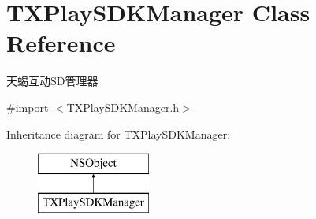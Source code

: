 \hypertarget{interface_t_x_play_s_d_k_manager}{}\section{T\+X\+Play\+S\+D\+K\+Manager Class Reference}
\label{interface_t_x_play_s_d_k_manager}


天蝎互动\+S\+D管理器  




{\ttfamily \#import $<$T\+X\+Play\+S\+D\+K\+Manager.\+h$>$}

Inheritance diagram for T\+X\+Play\+S\+D\+K\+Manager\+:\begin{figure}[H]
\begin{center}
\leavevmode
\includegraphics[height=2.000000cm]{interface_t_x_play_s_d_k_manager}
\end{center}
\end{figure}
